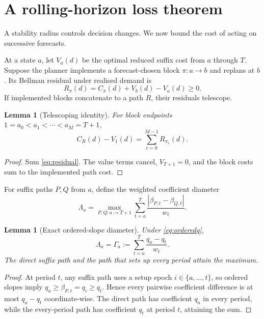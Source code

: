 \documentclass[11pt]{article}
\newtheorem{lemma}[theorem]{Lemma}
\theoremstyle{definition}
\begin{document}
\section{A rolling-horizon loss theorem}

A stability radius controls decision changes. We now bound the cost of acting on successive forecasts.

At a state $a$, let $V_a(d)$ be the optimal reduced suffix cost from $a$ through $T$. Suppose the planner implements a forecast-chosen block $\pi:a\to b$ and replans at $b$. Its Bellman residual under realised demand is
\begin{equation}\label{eq:residual}
R_\pi(d)=C_\pi(d)+V_b(d)-V_a(d)\ge0.
\end{equation}
If implemented blocks concatenate to a path $R$, their residuals telescope.

\begin{lemma}[Telescoping identity]\label{lem:telescope}
For block endpoints $1=a_0<a_1<\cdots<a_M=T+1$,
\begin{equation}\label{eq:telescope}
C_R(d)-V_1(d)=\sum_{r=0}^{M-1}R_{\pi_r}(d).
\end{equation}
\end{lemma}

\begin{proof}
Sum \eqref{eq:residual}. The value terms cancel, $V_{T+1}=0$, and the block costs sum to the implemented path cost.
\end{proof}

For suffix paths $P,Q$ from $a$, define the weighted coefficient diameter
\begin{equation}\label{eq:Lambda}
\Lambda_a=
\max_{P,Q:a\to T+1}
\sum_{t=a}^T\frac{|\beta_{P,t}-\beta_{Q,t}|}{w_t}.
\end{equation}

\begin{lemma}[Exact ordered-slope diameter]\label{lem:diameter}
Under \eqref{eq:orderedq},
\begin{equation}\label{eq:Gamma}
\Lambda_a=\Gamma_a:=
\sum_{t=a}^T\frac{q_a-q_t}{w_t}.
\end{equation}
The direct suffix path and the path that sets up every period attain the maximum.
\end{lemma}

\begin{proof}
At period $t$, any suffix path uses a setup epoch $i\in\{a,\ldots,t\}$, so ordered slopes imply $q_a\ge\beta_{P,t}=q_i\ge q_t$. Hence every pairwise coefficient difference is at most $q_a-q_t$ coordinate-wise. The direct path has coefficient $q_a$ in every period, while the every-period path has coefficient $q_t$ at period $t$, attaining the sum.
\end{proof}
\end{document}
